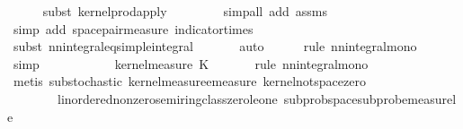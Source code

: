 \begin{isabellebody}
\ \ \ \ \isamarkupfalse%
\ {\isacharparenleft}{\kern0pt}subst\ kernel{\isacharunderscore}{\kern0pt}prod{\isacharunderscore}{\kern0pt}apply{\isacharparenright}{\kern0pt}\isanewline
\ \ \ \ \isamarkupfalse%
\ {\isacharasterisk}{\kern0pt}\ \isamarkupfalse%
\ {\isacharparenleft}{\kern0pt}simp{\isacharunderscore}{\kern0pt}all\ add{\isacharcolon}{\kern0pt}\ assms{\isacharparenright}{\kern0pt}\isanewline
\ \ \ \ \isamarkupfalse%
\ {\isacharparenleft}{\kern0pt}simp\ add{\isacharcolon}{\kern0pt}\ space{\isacharunderscore}{\kern0pt}pair{\isacharunderscore}{\kern0pt}measure\ indicator{\isacharunderscore}{\kern0pt}times{\isacharparenright}{\kern0pt}\isanewline
\ \ \ \ \isamarkupfalse%
\ {\isacharparenleft}{\kern0pt}subst{\isacharparenleft}{\kern0pt}{}{\isacharparenright}{\kern0pt}\ nn{\isacharunderscore}{\kern0pt}integral{\isacharunderscore}{\kern0pt}eq{\isacharunderscore}{\kern0pt}simple{\isacharunderscore}{\kern0pt}integral{\isacharparenright}{\kern0pt}\isanewline
\ \ \ \ \ \isamarkupfalse%
\ auto\isanewline
\ \ \ \ \isamarkupfalse%
\ {\isacharparenleft}{\kern0pt}rule\ nn{\isacharunderscore}{\kern0pt}integral{\isacharunderscore}{\kern0pt}mono{\isacharparenright}{\kern0pt}\isanewline
\ \ \ \ \isamarkupfalse%
\ simp\isanewline
\ \ \isamarkupfalse%
\ \isamarkupfalse%
\ {\isachardoublequoteopen}{\isachardot}{\kern0pt}{\isachardot}{\kern0pt}{\isachardot}{\kern0pt}\ {\isasymle}\ \ {\isasymintegral}\isactrlsup {\isacharplus}{\kern0pt}\ {\isasymomega}\ {}\ {\isasympartial}kernel{\isacharunderscore}{\kern0pt}measure\ K{\isacharunderscore}{\kern0pt}{}\ {\isasymomega}{\isachardoublequoteclose}\isanewline
\ \ \ \ \isamarkupfalse%
\ {\isacharparenleft}{\kern0pt}rule\ nn{\isacharunderscore}{\kern0pt}integral{\isacharunderscore}{\kern0pt}mono{\isacharparenright}{\kern0pt}\isanewline
\ \ \ \ \isamarkupfalse%
\ {\isacharparenleft}{\kern0pt}metis\ substochastic{\isacharparenleft}{\kern0pt}{}{\isacharparenright}{\kern0pt}\ kernel{\isacharunderscore}{\kern0pt}measure{\isacharunderscore}{\kern0pt}emeasure\ kernel{\isacharunderscore}{\kern0pt}not{\isacharunderscore}{\kern0pt}space{\isacharunderscore}{\kern0pt}zero\isanewline
\ \ \ \ \ \ \ \ linordered{\isacharunderscore}{\kern0pt}nonzero{\isacharunderscore}{\kern0pt}semiring{\isacharunderscore}{\kern0pt}class{\isachardot}{\kern0pt}zero{\isacharunderscore}{\kern0pt}le{\isacharunderscore}{\kern0pt}one\ subprob{\isacharunderscore}{\kern0pt}space{\isachardot}{\kern0pt}subprob{\isacharunderscore}{\kern0pt}emeasure{\isacharunderscore}{\kern0pt}le{\isacharunderscore}{\kern0pt}{}\ \isanewline

\end{isabellebody}
